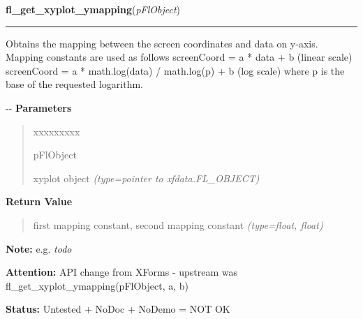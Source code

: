     \label{xformslib:flxyplot:fl_get_xyplot_ymapping}

    \vspace{0.5ex}

\hspace{.8\funcindent}\begin{boxedminipage}{\funcwidth}

    \raggedright \textbf{fl\_get\_xyplot\_ymapping}(\textit{pFlObject})

    \vspace{-1.5ex}

    \rule{\textwidth}{0.5\fboxrule}
\setlength{\parskip}{2ex}

Obtains the mapping between the screen coordinates and data on y-axis.
Mapping constants are used as follows
screenCoord = a * data + b       (linear scale)
screenCoord = a * math.log(data) / math.log(p) + b (log scale)
where p is the base of the requested logarithm.

-{}-
\setlength{\parskip}{1ex}
      \textbf{Parameters}
      \vspace{-1ex}

      \begin{quote}
        \begin{Ventry}{xxxxxxxxx}

          \item[pFlObject]


xyplot object
            {\it (type=pointer to xfdata.FL\_OBJECT)}

        \end{Ventry}

      \end{quote}

      \textbf{Return Value}
    \vspace{-1ex}

      \begin{quote}

first mapping constant, second mapping constant
      {\it (type=float, float)}

      \end{quote}

\textbf{Note:} 
e.g. \emph{todo}


\textbf{Attention:} 
API change from XForms - upstream was
fl\_get\_xyplot\_ymapping(pFlObject, a, b)


\textbf{Status:} 
Untested + NoDoc + NoDemo = NOT OK


    \end{boxedminipage}

